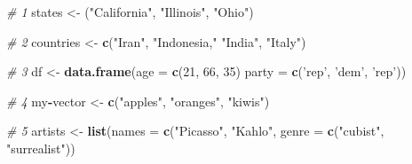 \documentclass[]{book}
\newenvironment{Shaded}{\begin{snugshade}}{\end{snugshade}}
\newcommand{\CommentTok}[1]{\textcolor[rgb]{0.56,0.35,0.01}{\textit{#1}}}
\newcommand{\DataTypeTok}[1]{\textcolor[rgb]{0.13,0.29,0.53}{#1}}
\newcommand{\DecValTok}[1]{\textcolor[rgb]{0.00,0.00,0.81}{#1}}
\newcommand{\KeywordTok}[1]{\textcolor[rgb]{0.13,0.29,0.53}{\textbf{#1}}}
\newcommand{\NormalTok}[1]{#1}
\newcommand{\OperatorTok}[1]{\textcolor[rgb]{0.81,0.36,0.00}{\textbf{#1}}}
\newcommand{\StringTok}[1]{\textcolor[rgb]{0.31,0.60,0.02}{#1}}
\begin{document}
\begin{Shaded}
\begin{Highlighting}[]
\CommentTok{# 1}
\NormalTok{states <-}\StringTok{ }\NormalTok{(}\StringTok{"California"}\NormalTok{, }\StringTok{"Illinois"}\NormalTok{, }\StringTok{"Ohio"}\NormalTok{)}

\CommentTok{# 2}
\NormalTok{countries <-}\StringTok{ }\KeywordTok{c}\NormalTok{(}\StringTok{"Iran"}\NormalTok{, }\StringTok{"Indonesia,"} \StringTok{"India"}\NormalTok{, }\StringTok{"Italy"}\NormalTok{)}

\CommentTok{# 3}
\NormalTok{df <-}\StringTok{ }\KeywordTok{data.frame}\NormalTok{(}\DataTypeTok{age =} \KeywordTok{c}\NormalTok{(}\DecValTok{21}\NormalTok{, }\DecValTok{66}\NormalTok{, }\DecValTok{35}\NormalTok{)}
                 \DataTypeTok{party =} \KeywordTok{c}\NormalTok{(}\StringTok{'rep'}\NormalTok{, }\StringTok{'dem'}\NormalTok{, }\StringTok{'rep'}\NormalTok{))}

\CommentTok{# 4}
\NormalTok{my}\OperatorTok{-}\NormalTok{vector <-}\StringTok{ }\KeywordTok{c}\NormalTok{(}\StringTok{"apples"}\NormalTok{, }\StringTok{"oranges"}\NormalTok{, }\StringTok{"kiwis"}\NormalTok{)}

\CommentTok{# 5}
\NormalTok{artists <-}\StringTok{ }\KeywordTok{list}\NormalTok{(}\DataTypeTok{names =} \KeywordTok{c}\NormalTok{(}\StringTok{"Picasso"}\NormalTok{, }\StringTok{"Kahlo"}\NormalTok{,}
                \DataTypeTok{genre =} \KeywordTok{c}\NormalTok{(}\StringTok{"cubist"}\NormalTok{, }\StringTok{"surrealist"}\NormalTok{))}
\end{Highlighting}
\end{Shaded}
\end{document}
